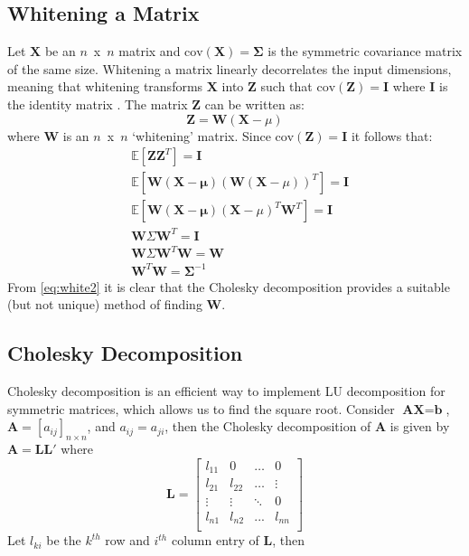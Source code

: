 \documentclass[conference]{IEEEtran}
\begin{document}
\subsection{Whitening a Matrix}\label{a:whitening}
Let $\textbf{X}$ be an $n$~x~$n$ matrix and $\mbox{cov}(\textbf{X}) = \mathbf{\Sigma}$ is the symmetric covariance matrix of the same size.
Whitening a matrix linearly decorrelates the input dimensions, meaning that whitening transforms $\textbf{X}$ into $\textbf{Z}$ such that $\mbox{cov}(\textbf{Z}) = \textbf{I}$ where $\textbf{I}$ is the identity matrix \cite{kessy2017optimal}. 
The matrix $\textbf{Z}$ can be written as:
\begin{equation}
\textbf{Z} = \textbf{W}(\textbf{X} - \mu)
\label{eq:white1}
\end{equation}
where $\textbf{W}$ is an $n$~x~$n$ `whitening' matrix. Since $\mbox{cov}(\textbf{Z}) = \textbf{I}$ it follows that:
\begin{align}
&\mathbb{E}[\mathbf{Z}\mathbf{Z}^T] = \mathbf{I} \nonumber \\
&\mathbb{E}[\mathbf{W}(\mathbf{X - \mu})(\mathbf{W}(\mathbf{X} - \mu))^T] = \mathbf{I} \nonumber \\
&\mathbb{E}[\mathbf{W}(\mathbf{X - \mu})(\mathbf{X} - \mu)^T\mathbf{W}^T] = \mathbf{I} \nonumber \\
&\mathbf{W}\Sigma\mathbf{W}^T = \mathbf{I} \nonumber \\
&\mathbf{W}\Sigma\mathbf{W}^T\mathbf{W} = \mathbf{W} \nonumber \\
&\mathbf{W}^T \mathbf{W} = \mathbf{\Sigma}^{-1} \label{eq:white2}
\end{align}
From \eqref{eq:white2} it is clear that the Cholesky decomposition provides a suitable (but not unique) method of finding $\textbf{W}$.

\subsection{Cholesky Decomposition}
Cholesky decomposition is an efficient way to implement LU decomposition for symmetric matrices, which allows us to find the square root.
Consider $\textbf{A}\textbf{X} = \textbf{b}$, $\textbf{A}=[a_{ij}]_{n\times n}$, and $a_{ij} = a_{ji}$, then the Cholesky decomposition of $\textbf{A}$ is given by $\textbf{A} = \textbf{L}\textbf{L}'$ where
\begin{equation}
\textbf{L}=
\begin{bmatrix}
 l_{11} & 0 & \ldots & 0 \\
 l_{21} & l_{22} & \ldots & \vdots \\
 \vdots & \vdots & \ddots & 0 \\
 l_{n1} & l_{n2} & ... & l_{nn} \\
\end{bmatrix}
\label{eq:cholesky1}
\end{equation}
Let $l_{ki}$ be the $k^{th}$ row and $i^{th}$ column entry of $\textbf{L}$, then
\end{document}
